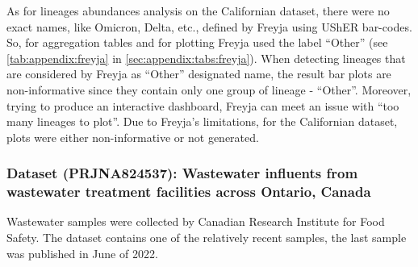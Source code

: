     As for lineages abundances analysis on the Californian dataset, there were no exact names, like Omicron, Delta, etc., defined by Freyja using UShER bar-codes. So, for aggregation tables and for plotting Freyja used the label “Other” (see \cref{tab:appendix:freyja} in \cref{sec:appendix:tabs:freyja}). When detecting lineages that are considered by Freyja as “Other” designated name, the result bar plots are non-informative since they contain only one group of lineage - “Other”. Moreover, trying to produce an interactive dashboard, Freyja can meet an issue with “too many lineages to plot”. Due to Freyja's limitations, for the Californian dataset, plots were either non-informative or not generated.
    
    \subsubsection{Dataset (PRJNA824537): Wastewater influents from wastewater treatment facilities across Ontario, Canada} \label{sec:results:real:canada}
    Wastewater samples were collected by Canadian Research Institute for Food Safety. The dataset contains one of the relatively recent samples, the last sample was published in June of 2022.

